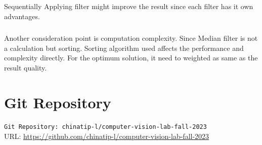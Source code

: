 \documentclass[12pt,a4paper]{report}
\begin{document}
\paragraph*{}Sequentially Applying filter might improve the result since each filter has it own advantages.

\paragraph*{}Another consideration point is computation complexity. Since Median filter is not a calculation but sorting. Sorting algorithm used affects the performance and complexity directly. For the optimum solution, it need to weighted as same as the result quality.

\appendix
\chapter{Git Repository}

\verb|Git Repository: chinatip-l/computer-vision-lab-fall-2023| \\
URL: \url{https://github.com/chinatip-l/computer-vision-lab-fall-2023}
\end{document}

